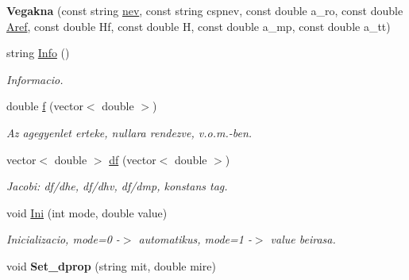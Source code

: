 \begin{DoxyCompactItemize}
\item 
{\bfseries Vegakna} (const string \hyperlink{class_agelem_abe92b7e3912367d5d1caf6b277ca0b7d}{nev}, const string cspnev, const double a\+\_\+ro, const double \hyperlink{class_agelem_a3f8668febc2958fd539997d537552f17}{Aref}, const double Hf, const double H, const double a\+\_\+mp, const double a\+\_\+tt)\hypertarget{class_vegakna_ae4041ee2a843f526bebded5f99ff2824}{}\label{class_vegakna_ae4041ee2a843f526bebded5f99ff2824}

\item 
string \hyperlink{class_vegakna_a9b47670176b3cff6d577e7a5b7ef7eb2}{Info} ()\hypertarget{class_vegakna_a9b47670176b3cff6d577e7a5b7ef7eb2}{}\label{class_vegakna_a9b47670176b3cff6d577e7a5b7ef7eb2}

\begin{DoxyCompactList}\small\item\em Informacio. \end{DoxyCompactList}\item 
double \hyperlink{class_vegakna_a1f4c98796c6ceb9fbdd935b20af6ab42}{f} (vector$<$ double $>$)\hypertarget{class_vegakna_a1f4c98796c6ceb9fbdd935b20af6ab42}{}\label{class_vegakna_a1f4c98796c6ceb9fbdd935b20af6ab42}

\begin{DoxyCompactList}\small\item\em Az agegyenlet erteke, nullara rendezve, v.\+o.\+m.-\/ben. \end{DoxyCompactList}\item 
vector$<$ double $>$ \hyperlink{class_vegakna_ac76d7d751b9dd9f28b5470ea68625345}{df} (vector$<$ double $>$)\hypertarget{class_vegakna_ac76d7d751b9dd9f28b5470ea68625345}{}\label{class_vegakna_ac76d7d751b9dd9f28b5470ea68625345}

\begin{DoxyCompactList}\small\item\em Jacobi\+: df/dhe, df/dhv, df/dmp, konstans tag. \end{DoxyCompactList}\item 
void \hyperlink{class_vegakna_adaa3748adf56c35c7fb91d014eccb8fe}{Ini} (int mode, double value)\hypertarget{class_vegakna_adaa3748adf56c35c7fb91d014eccb8fe}{}\label{class_vegakna_adaa3748adf56c35c7fb91d014eccb8fe}

\begin{DoxyCompactList}\small\item\em Inicializacio, mode=0 -\/$>$ automatikus, mode=1 -\/$>$ value beirasa. \end{DoxyCompactList}\item 
void {\bfseries Set\+\_\+dprop} (string mit, double mire)\hypertarget{class_vegakna_a6a5d3d90d5e0be90481bdd144c652208}{}\label{class_vegakna_a6a5d3d90d5e0be90481bdd144c652208}


\end{DoxyCompactItemize}
